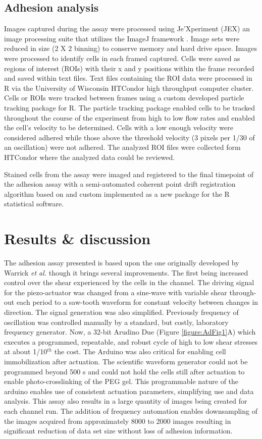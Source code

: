 \subsection{Adhesion analysis}

Images captured during the assay were processed using Je'Xperiment (JEX) an image processing suite that utilizes the ImageJ framework \cite{Warrick2016, Warrick2013}. Image sets were reduced in size (2 X 2 binning) to conserve memory and hard drive space. Images were processed to identify cells in each framed captured. Cells were saved as regions of interest (ROIs) with their x and y positions within the frame recorded and saved within text files. Text files containing the ROI data were processed in R via the University of Wisconsin HTCondor high throughput computer cluster. Cells or ROIs were tracked between frames using a custom developed particle tracking package for R. The particle tracking package enabled cells to be tracked throughout the course of the experiment from high to low flow rates and enabled the cell's velocity to be determined. Cells with a low enough velocity were considered adhered while those above the threshold velocity (3 pixels per 1/30 of an oscillation) were not adhered. The analyzed ROI files were collected form HTCondor where the analyzed data could be reviewed. 

Stained cells from the assay were imaged and registered to the final timepoint of the adhesion assay with a semi-automated coherent point drift registration algorithm based on \cite{Myronenko2010} and custom implemented as a new package for the R statistical software. 

\section{Results \& discussion}

The adhesion assay presented is based upon the one originally developed by Warrick \textit{et al.} though it brings several improvements. The first being increased control over the shear experienced by the cells in the channel. The driving signal for the piezo-actuator was changed from a sine-wave with variable shear through-out each period to a saw-tooth waveform for constant velocity between changes in direction. The signal generation was also simplified. Previously frequency of oscillation was controlled manually by a standard, but costly, laboratory frequency generator. Now, a 32-bit Arudino Due (Figure \ref{figure:AdFig1}A) which executes a programmed, repeatable, and robust cycle of high to low shear stresses at about 1/10$^{th}$ the cost. The Arduino was also critical for enabling cell immobilization after actuation. The scientific waveform generator could not be programmed beyond 500 s and could not hold the cells still after actuation to enable photo-crosslinking of the PEG gel. This programmable nature of the arduino enables use of consistent actuation parameters, simplifying use and data analysis. This assay also results in a large quantity of images being created for each channel run. The addition of frequency automation enables downsampling of the images acquired from approximately 8000 to 2000 images resulting in significant reduction of data set size without loss of adhesion information.

